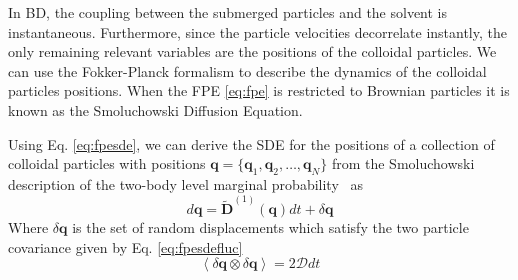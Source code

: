 \documentclass[twoside,openright,titlepage,numbers=noenddot,%
headinclude,footinclude,cleardoublepage=empty,abstract=on,
BCOR=5mm,fontsize=11pt, dvipsnames, paper=b5
]{scrreprt}
\renewcommand{\vec}[1]{\bm{#1}}
\newcommand{\tens}[1]{\bm{\mathcal{#1}}}
\newcommand{\ppos}{q}
\begin{document}
In \gls{BD}, the coupling between the submerged particles and the solvent is instantaneous.
Furthermore, since the particle velocities decorrelate instantly, the only remaining relevant variables are the positions of the colloidal particles. We can use the Fokker-Planck formalism to describe the dynamics of the colloidal particles positions. When the \gls{FPE} \eqref{eq:fpe} is restricted to Brownian particles it is known as the Smoluchowski Diffusion Equation.

Using Eq. \eqref{eq:fpesde}, we can derive the \gls{SDE} for the positions of a collection of colloidal particles with positions $\vec{q} =\{\vec{q}_1,\vec{q}_2,\dots, \vec{q}_N\}$ from the Smoluchowski description of the two-body level marginal probability~\cite{Dhont1996} as
\begin{equation}
  \label{eq:bdlange}
  d\vec{\ppos} = \widetilde{\vec{D}}^{(1)}(\vec{\ppos})dt + \delta\vec{\ppos}
\end{equation}
Where $\delta\vec{q}$ is the set of random displacements which satisfy the two particle covariance given by Eq. \eqref{eq:fpesdefluc} 
\begin{equation}
  \label{eq:bdfluc}
  \left\langle \delta\vec{\ppos}\otimes \delta\vec{\ppos}\right\rangle = 2\tens{D} dt
\end{equation}
\end{document}
